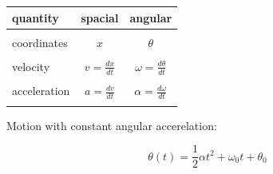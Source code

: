\documentclass[]{beamer}
\begin{document}



 \begin{frame}

    \begin{center}
        \begin{tabular}{| l |c |c |}
            \hline
         quantity & spacial & angular \\ 
         \hline
          &  &  \\ 
          coordinates & $x$ & $\theta$ \\  
          &  &  \\ 
         velocity & $v=\frac{d x}{d t}$ & $\omega=\frac{d \theta}{d t}$  \\
         &  &  \\ 
         acceleration & $a=\frac{d v}{d t}$ & $\alpha=\frac{d \omega}{d t}$  \\
         &  &  \\ 
         \hline
        \end{tabular}
        \end{center}


        Motion with constant angular accerelation:

        \begin{equation}
\theta(t)=\frac{1}{2}\alpha t^2+\omega_0 t+\theta_0
        \end{equation}


        \end{frame}
    

        

              























 
\end{document}
